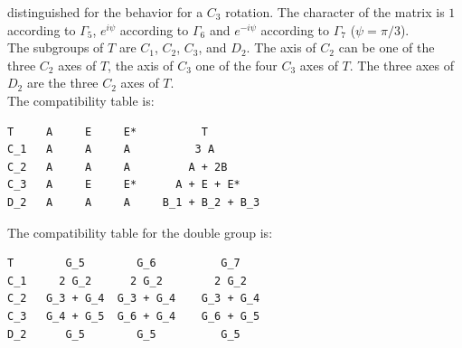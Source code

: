 \documentclass[12pt,a4paper]{article}
\begin{document}
distinguished for the behavior for a $C_3$ rotation. The character of
the matrix is $1$ according to $\Gamma_5$, $e^{i\psi}$ according to $\Gamma_6$
and $e^{-i\psi}$ according to $\Gamma_7$ ($\psi=\pi/3$). \\
The subgroups of $T$ are $C_1$, $C_2$, $C_3$, and $D_2$. The axis of $C_2$
can be one of the three $C_2$ axes of $T$, the axis of $C_3$ one of the 
four $C_3$ axes of $T$. The three axes of $D_2$ are the three $C_2$ axes of
$T$. \\
The compatibility table is:
\begin{verbatim}
T     A     E     E*          T
C_1   A     A     A          3 A
C_2   A     A     A         A + 2B  
C_3   A     E     E*      A + E + E*
D_2   A     A     A     B_1 + B_2 + B_3
\end{verbatim}
The compatibility table for the double group is:
\begin{verbatim}
T        G_5        G_6          G_7   
C_1     2 G_2      2 G_2        2 G_2
C_2   G_3 + G_4  G_3 + G_4    G_3 + G_4
C_3   G_4 + G_5  G_6 + G_4    G_6 + G_5
D_2      G_5        G_5          G_5
\end{verbatim}

\newpage
\end{document}
